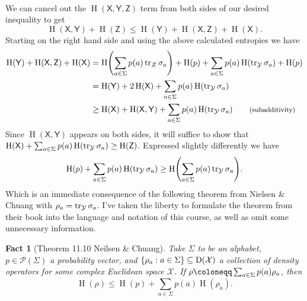 \documentclass[boxes,pages,color=SeaGreen]{homework}
\newtheorem*{fact}{Fact}
\newcommand{\X}{\mathcal{X}}
\newcommand{\Y}{\mathcal{Y}}
\newcommand{\Z}{\mathcal{Z}}
\renewcommand{\P}{\mathcal{P}}
\newcommand{\reg}[1]{\mathsf{#1}}
\newcommand{\ent}{\operatorname{H}}
\newcommand{\smalltag}[1]{\tag*{\footnotesize (#1)}}
\newcommand{\Density}{\mathrm{D}}
\begin{document}
\begin{solution}
\begin{align*}
    \end{align*}
    We can cancel out the $\ent(\reg{X}, \reg{Y}, \reg{Z})$ term from both sides of our desired inequality to get
    \begin{equation*}
        \ent(\reg{X}, \reg{Y}) + \ent(\reg{Z}) \leq \ent(\reg{Y}) + \ent(\reg{X}, \reg{Z}) + \ent(\reg{X}).
    \end{equation*}
    Starting on the right hand side and using the above calculated entropies we have
    \begin{align*}
        \ent(\reg{Y}) + \ent(\reg{X}, \reg{Z}) + \ent(\reg{X}) & = \ent\!\qty(\sum_{a \in \Sigma} p(a)\tr_\Z\sigma_a) + \ent(p) + \sum_{a \in \Sigma} p(a)\ent(\tr_\Y\sigma_a) + \ent(p) \\
                                                               & = \ent(\reg{Y}) + 2\ent(\reg{X}) + \sum_{a \in \Sigma} p(a)\ent(\tr_\Y\sigma_a)                                         \\
                                                               & \geq \ent(\reg{X}) + \ent(\reg{X}, \reg{Y}) + \sum_{a \in \Sigma} p(a)\ent(\tr_\Y\sigma_a) \smalltag{subadditivity}
    \end{align*}
    Since $\ent(\reg{X}, \reg{Y})$ appears on both sides, it will suffice to show that $\ent(\reg{X}) + \sum_{a \in \Sigma} p(a)\ent(\tr_\Y\sigma_a) \geq \ent(\reg{Z})$.
    Expressed slightly differently we have
    \begin{equation*}
        \ent(p) + \sum_{a \in \Sigma} p(a)\ent(\tr_\Y\sigma_a) \geq \ent\!\qty(\sum_{a \in \Sigma} p(a) \tr_\Y\sigma_a).
    \end{equation*}
    Which is an immediate consequence of the following theorem from Nielsen \& Chuang with $\rho_a = \tr_\Y\sigma_a$.
    I've taken the liberty to formulate the theorem from their book into the language and notation of this course, as well as omit some unnecessary information.
    \begin{fact}[Theorem 11.10 Neilsen \& Chuang]
        Take $\Sigma$ to be an alphabet, $p \in \P(\Sigma)$ a probability vector, and $\qty{\rho_a : a \in \Sigma} \subseteq \Density(\X)$ a collection of density operators for some complex Euclidean space $\X$.
        If $\rho \defeq \sum_{a \in \Sigma} p(a)\rho_a$, then
        \begin{equation*}
            \ent(\rho) \leq \ent(p) + \sum_{a \in \Sigma} p(a) \ent(\rho_a).
        \end{equation*}
    \end{fact}
\end{solution}
\end{document}

